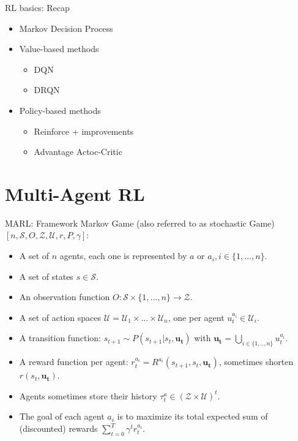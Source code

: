 \documentclass[9pt, hyperref={pdfusetitle,colorlinks=true,allcolors=DarkBlue}]{beamer}
\begin{document}
\begin{frame}{RL basics: Recap}

    

\begin{itemize}
    \item Markov Decision Process
    \vfill
    \item Value-based methods
        \begin{itemize}
        \item DQN
        \item DRQN
        \end{itemize}{}
    \vfill
    \item Policy-based methods
        \begin{itemize}
        \item Reinforce + improvements
        \item Advantage Actoc-Critic
        \end{itemize}{}
    \vfill
\end{itemize}{}

\end{frame}

\section{Multi-Agent RL}
\begin{frame}{MARL: Framework}
    Markov Game (also referred to as stochastic Game) $[n, \mathcal{S}, O, \mathcal{Z}, \mathcal{U}, r, P, \gamma]$:
    \vfill
    \begin{itemize}
        \item A set of $n$ agents, each one is represented by $a$ or $a_i, i \in  \{1,...,n\}$.
        \vfill
        \item A set of states $s \in \mathcal{S}$.
        \vfill
        \item An observation function $O:\mathcal{S} \times \{1,...,n\} \rightarrow \mathcal{Z}$.
        \vfill
        \item A set of action spaces $\mathcal{U}=\mathcal{U}_1 \times ... \times \mathcal{U}_n$, one per agent $u^{a_i}_{t} \in \mathcal{U}_i$.
        \vfill
        \item A transition function: $s_{t+1} \sim P(s_{t+1} | s_t, \boldsymbol{u_t})$ with $\boldsymbol{u_t}=\bigcup_{i \in \{1,..,n\}} u^{a_i}_t$.
        \vfill
        \item A reward function per agent:  $r^{a_i}_t = R^{a_i}(s_{t+1}, s_t, \boldsymbol{u_t})$, sometimes shorten $r(s_t, \boldsymbol{u_t})$.
        \vfill
        \item Agents sometimes store their history $\tau^a_t \in (\mathcal{Z} \times \mathcal{U})^t$.
        \vfill
        \item The goal of each agent $a_i$ is to maximize its total expected sum of (discounted) rewards $\sum_{t=0}^{T} \gamma^t r^{a_i}_t$.
    \end{itemize}{}
\end{frame}
\end{document}
